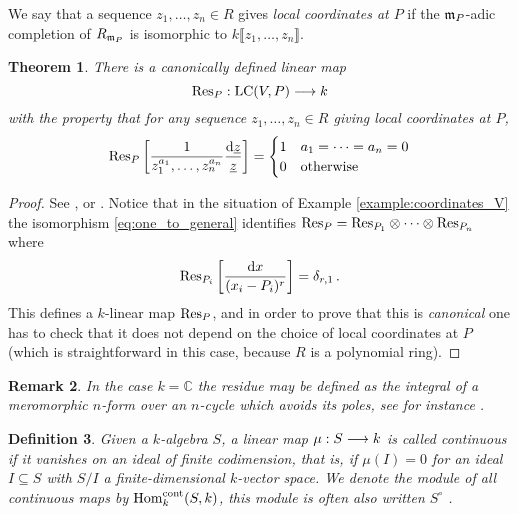 \documentclass[english,letter paper,12pt,reqno]{article}
\newtheorem{theorem}{Theorem}[section]
\theoremstyle{example}
\newtheorem{definition}[theorem]{Definition}
\newtheorem{remark}[theorem]{Remark}
\numberwithin{equation}{section}
\def\Hom{\operatorname{Hom}}
\DeclareMathOperator{\LC}{LC}
\begin{document}
We say that a sequence $z_1,\ldots,z_n \in R$ gives \emph{local coordinates at $P$} if the $\mathfrak{m}_P$-adic completion of $R_{\mathfrak{m}_P}$ is isomorphic to $k \llbracket z_1,\ldots,z_n \rrbracket$.


  
\begin{theorem}\label{theorem:compute_res} There is a canonically defined linear map
\[
\Res_{P}: \LC(V,P) \lto k
\]
with the property that for any sequence $z_1,\ldots,z_n \in R$ giving local coordinates at $P$,
\[
\operatorname{Res}\!_{P} \left[ \frac{1}{z_1^{a_1}, \ldots, z_n^{a_n}} \frac{\operatorname{d}\!{\underline{z}}}{\underline{z}} \right] = \begin{cases} 1 & a_1 = \cdots = a_n = 0 \\ 0 & \textup{otherwise} \end{cases}
\]
\end{theorem} 
\begin{proof}
See \cite[\S 5.3]{Lipman01}, \cite[pp.64--67]{Lipman84} or \cite{Kunz08}. Notice that in the situation of Example \ref{example:coordinates_V} the isomorphism \eqref{eq:one_to_general} identifies $\operatorname{Res}\!_{P} = \operatorname{Res}\!_{P_1} \otimes \cdots \otimes \operatorname{Res}\!_{P_n}$ where
\[
\operatorname{Res}\!_{P_i} \left[ \frac{\operatorname{d}\!{x}}{(x_i-P_i)^r} \right] = \delta_{r,1}\,.
\]
This defines a $k$-linear map $\operatorname{Res}\!_P$, and in order to prove that this is \emph{canonical} one has to check that it does not depend on the choice of local coordinates at $P$ (which is straightforward in this case, because $R$ is a polynomial ring).
\end{proof}

\begin{remark} In the case $k = \mathbb{C}$ the residue may be defined as the integral of a meromorphic $n$-form over an $n$-cycle which avoids its poles, see for instance \cite[Chapter V]{Griffiths}.
\end{remark}

\begin{definition} Given a $k$-algebra $S$, a linear map $\mu: S \longrightarrow k$ is called \emph{continuous} if it vanishes on an ideal of finite codimension, that is, if $\mu( I ) = 0$ for an ideal $I \subseteq S$ with $S/I$ a finite-dimensional $k$-vector space. We denote the module of all continuous maps by $\Hom_k^{\cont}(S,k)$, this module is often also written $S^{\circ}$ \cite[Chapter 6]{sweedler}.
\end{definition}
\end{document}
